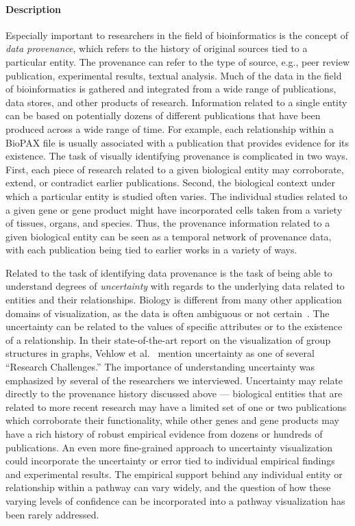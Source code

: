 \documentclass[twocolumn]{bmcart}%
\begin{document}
\paragraph*{Description}

Especially important to researchers in the field of bioinformatics is the concept of \textit{data provenance}, which refers to the history of original sources tied to a particular entity.
The provenance can refer to the type of source, e.g., peer review publication, experimental results, textual analysis.
Much of the data in the field of bioinformatics is gathered and integrated from a wide range of publications, data stores, and other products of research.
Information related to a single entity can be based on potentially dozens of different publications that have been produced across a wide range of time.
For example, each relationship within a BioPAX file is usually associated with a publication that provides evidence for its existence.
The task of visually identifying provenance is complicated in two ways.
First, each piece of research related to a given biological entity may corroborate, extend, or contradict earlier publications.
Second, the biological context under which a particular entity is studied often varies.
The individual studies related to a given gene or gene product might have incorporated cells taken from a variety of tissues, organs, and species.
Thus, the provenance information related to a given biological entity can be seen as a temporal network of provenance data, with each publication being tied to earlier works in a variety of ways.

Related to the task of identifying data provenance is the task of being able to understand degrees of \textit{uncertainty} with regards to the underlying data related to entities and their relationships.
Biology is different from many other application domains of visualization, as the data is often ambiguous or not certain~\cite{kohlbacher2014multivariate}.
The uncertainty can be related to the values of specific attributes or to the existence of a relationship.
In their state-of-the-art report on the visualization of group structures in graphs, Vehlow et al.~\cite{vehlow2015state} mention uncertainty as one of several ``Research Challenges.''
The importance of understanding uncertainty was emphasized by several of the researchers we interviewed.
Uncertainty may relate directly to the provenance history discussed above --- biological entities that are related to more recent research may have a limited set of one or two publications which corroborate their functionality, while other genes and gene products may have a rich history of robust empirical evidence from dozens or hundreds of publications.
An even more fine-grained approach to uncertainty visualization could incorporate the uncertainty or error tied to individual empirical findings and experimental results.
The empirical support behind any individual entity or relationship within a pathway can vary widely, and the question of how these varying levels of confidence can be incorporated into a pathway visualization has been rarely addressed.
\end{document}
